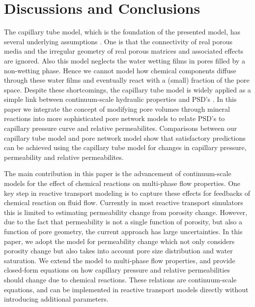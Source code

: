 \documentclass[preprint,12pt,authoryear]{elsarticle}
\begin{document}
\section{Discussions and Conclusions}
The capillary tube model, which is the foundation of the presented model, has several underlying assumptions \citep{larson1981percolation}. One is that the connectivity of real porous media and the irregular geometry of real porous matrices and associated effects are ignored. Also this model neglects the water wetting films in pores filled by a non-wetting phase. Hence we cannot model how chemical components diffuse through these water films and eventually react with a (small) fraction of the pore space. Despite these shortcomings, the capillary tube model is widely applied as a simple link between continuum-scale hydraulic properties and PSD's \citep{taylor1990biofilm}. In this paper we integrate the concept of modifying pore volumes through mineral reactions into more sophisticated pore network models to relate PSD's to capillary pressure curve and relative permeabilites. Comparisons between our capillary tube model and pore network model show that satisfactory predictions can be achieved using the capillary tube model for changes in capillary pressure, permeability and relative permeabilites. 

The main contribution in this paper is the advancement of continuum-scale models for the effect of chemical reactions on multi-phase flow properties. One key step in reactive transport modeling is to capture these effects for feedbacks of chemical reaction on fluid flow. Currently in most reactive transport simulators this is limited to estimating permeability change from porosity change. However, due to the fact that permeability is not a single function of porosity, but also a function of pore geometry, the current approach has large uncertainties. In this paper, we adopt the \citet{liu2013permeability} model for permeability change which not only considers porosity change but also takes into account pore size distribution and water saturation. We extend the \citet{liu2013permeability} model to multi-phase flow properties, and provide closed-form equations on how capillary pressure and relative permeabilities should change due to chemical reactions. These relations are continuum-scale equations, and can be implemented in reactive transport models directly without introducing additional parameters. 


\end{document}
